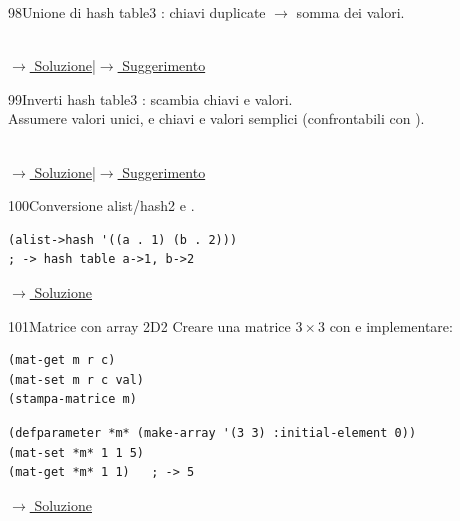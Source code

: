 \label{ex:98}
\begin{colbox}{98}{Unione di hash table}{3}
 : chiavi duplicate
$\to$ somma dei valori.\\\\

\small\color{black!55}\hyperref[sol:98]{$\rightarrow$ Soluzione}\enspace\textcolor{black!30}{|}\enspace\hyperref[hint:98]{$\rightarrow$ Suggerimento}\normalsize\color{black}
\end{colbox}

\label{ex:99}
\begin{colbox}{99}{Inverti hash table}{3}
 : scambia chiavi e valori.\\
Assumere valori unici, e chiavi e valori semplici (confrontabili con ).\\\\

\small\color{black!55}\hyperref[sol:99]{$\rightarrow$ Soluzione}\enspace\textcolor{black!30}{|}\enspace\hyperref[hint:99]{$\rightarrow$ Suggerimento}\normalsize\color{black}
\end{colbox}

\label{ex:100}
\begin{stdbox}{100}{Conversione alist/hash}{2}
  e .
\nopagebreak
\begin{lstlisting}
(alist->hash '((a . 1) (b . 2)))
; -> hash table a->1, b->2
\end{lstlisting}


\small\color{black!55}\hyperref[sol:100]{$\rightarrow$ Soluzione}\normalsize\color{black}
\end{stdbox}

\label{ex:101}
\begin{essbox}{101}{Matrice con array 2D}{2}
Creare una matrice $3 \times 3$ con  e implementare:
\begin{lstlisting}
(mat-get m r c)
(mat-set m r c val)
(stampa-matrice m)
\end{lstlisting}
\begin{lstlisting}
(defparameter *m* (make-array '(3 3) :initial-element 0))
(mat-set *m* 1 1 5)
(mat-get *m* 1 1)   ; -> 5
\end{lstlisting}


\small\color{black!55}\hyperref[sol:101]{$\rightarrow$ Soluzione}\normalsize\color{black}
\end{essbox}

